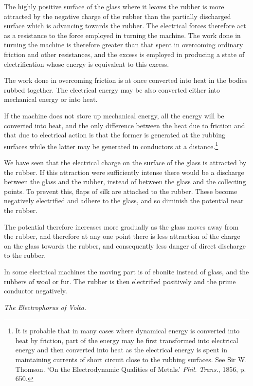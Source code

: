 \documentclass[11pt,a4paper]{article}
\begin{document}
The highly positive surface of the glass where it leaves the rubber is
more attracted by the negative charge of the rubber than the partially
discharged surface which is advancing towards the rubber. The electrical
forces therefore act as a resistance to the force employed in turning the
machine. The work done in turning the machine is therefore greater than
that spent in overcoming ordinary friction and other resistances, and the
excess is employed in producing a state of electrification whose energy
is equivalent to this excess.

The work done in overcoming friction is at once converted into heat in
the bodies rubbed together. The electrical energy may be also converted
either into mechanical energy or into heat.

If the machine does not store up mechanical energy, all the energy will
be converted into heat, and the only difference between the heat due to
friction and that due to electrical action is that the former is
generated at the rubbing surfaces while the latter may be generated in
conductors at a distance.\footnote{It is probable that in many cases
where dynamical energy is converted into heat by friction, part of the
energy may be first transformed into electrical energy and then converted
into heat as the electrical energy is spent in maintaining currents of
short circuit close to the rubbing surfaces. See Sir W. Thomson. `On the
Electrodynamic Qualities of Metals.' \textit{Phil. Trans.}, 1856, p.
650.}

We have seen that the electrical charge on the surface of the glass is
attracted by the rubber. If this attraction were sufficiently intense
there would be a discharge between the glass and the rubber, instead of
between the glass and the collecting points. To prevent this, flaps of
silk are attached to the rubber. These become negatively electrified and
adhere to the glass, and so diminish the potential near the rubber.

The potential therefore increases more gradually as the glass moves away
from the rubber, and therefore at any one point there is less attraction
of the charge on the glass towards the rubber, and consequently less
danger of direct discharge to the rubber.

In some electrical machines the moving part is of ebonite instead of
glass, and the rubbers of wool or fur. The rubber is then electrified
positively and the prime conductor negatively.

\begin{center}
\textit{The Electrophorus of Volta.}
\end{center}
\end{document}

